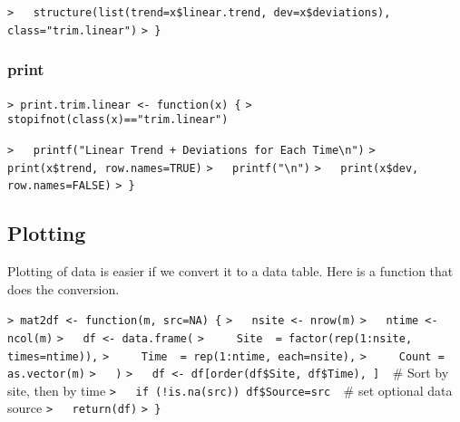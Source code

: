 \documentclass[a4paper]{article}
\begin{document}
\verb~>   structure(list(trend=x$linear.trend, dev=x$deviations), class="trim.linear")~\newline
\verb~> }~\par



\subsubsection{print}\par

\verb~> print.trim.linear <- function(x) {~\newline
\verb~>   stopifnot(class(x)=="trim.linear")~\par

\verb~>   printf("Linear Trend + Deviations for Each Time\n")~\newline
\verb~>   print(x$trend, row.names=TRUE)~\newline
\verb~>   printf("\n")~\newline
\verb~>   print(x$dev, row.names=FALSE)~\newline
\verb~> }~\par





\subsection{Plotting}\par


Plotting of data is easier if we convert it to a data table.
Here is a function that does the conversion.\par
\verb~> mat2df <- function(m, src=NA) {~\newline
\verb~>   nsite <- nrow(m)~\newline
\verb~>   ntime <- ncol(m)~\newline
\verb~>   df <- data.frame(~\newline
\verb~>     Site  = factor(rep(1:nsite, times=ntime)),~\newline
\verb~>     Time  = rep(1:ntime, each=nsite),~\newline
\verb~>     Count = as.vector(m)~\newline
\verb~>   )~\newline
\verb~>   df <- df[order(df$Site, df$Time), ]  ~{\sffamily\# Sort by site, then by time}\newline
\verb~>   if (!is.na(src)) df$Source=src  ~{\sffamily\# set optional data source}\newline
\verb~>   return(df)~\newline
\verb~> }~\par
\end{document}
